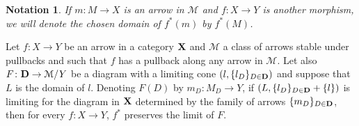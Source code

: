 \documentclass[a4paper,UKenglish,cleveref,pdftex,thm-restate,numberwithinsect]{lipics-v2021}
\def\D{\textbf {\textup{D}}}
\def\X{\textbf {\textup{X}}}
\newtheorem*{notation}{Notation}
\begin{document}
\begin{notation}
	If $m\colon M\to X$ is an arrow in $\mathcal{M}$ and $f\colon X\to Y$ is another morphism, we will denote the chosen domain of $f^*(m)$ by $f^*(M)$.
\end{notation}

\begin{proposition} Let $f\colon X\to Y$ be an arrow in a category $\X$ and $\mathcal{M}$ a class of arrows stable under pullbacks and such that $f$ has a pullback along any arrow in $\mathcal{M}$. Let also $F\colon\D\to \mathcal{M}/Y$ be a diagram with a limiting cone $(l, \{l_D\}_{D\in \D})$ and suppose that  $L$ is the domain of $l$. Denoting $F(D)$ by  $m_D\colon M_D\to Y$, if  $(L, \{l_D\}_{D\in \D}+\{l\})$ is limiting for the diagram in $\X$ determined by the family of arrows $\{m_D\}_{D\in \D}$, then for every $f\colon X\to Y$, $f^*$ preserves the limit of $F$.
\end{proposition}
\end{document}

